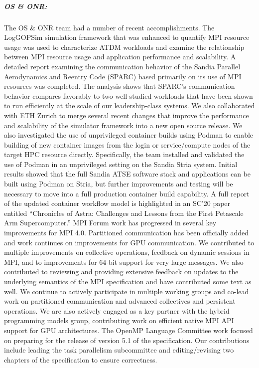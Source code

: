 \subparagraph{OS \& ONR:} The OS \& ONR team had a number of recent accomplishments. The LogGOPSim simulation framework that was enhanced to quantify MPI resource usage was used to characterize ATDM workloads and examine the relationship between MPI resource usage and application performance and scalability. A detailed report examining the communication behavior of the Sandia Parallel Aerodynamics and Reentry Code (SPARC) based primarily on its use of MPI resources was completed. The analysis shows that SPARC's communication behavior compares favorably to two well-studied workloads that have been shown to run efficiently at the scale of our leadership-class systems. We also collaborated with ETH Zurich to merge several recent changes that improve the performance and scalability of the simulator framework into a new open source release. We also investigated the use of unprivileged container builds using Podman to enable building of new container images from the login or service/compute nodes of the target HPC resource directly. Specifically, the team installed and validated the use of Podman in an unprivileged setting on the Sandia Stria system. Initial results showed that the full Sandia ATSE software stack and applications can be built using Podman on Stria, but further improvements and testing will be necessary to move into a full production container build capability.  A full report of the updated container workflow model is highlighted in an SC'20 paper entitled ``Chronicles of Astra: Challenges and Lessons from the First Petascale Arm Supercomputer.'' MPI Forum work has progressed in several key improvements for MPI 4.0. Partitioned communication has been officially added and work continues on improvements for GPU communication. We contributed to multiple improvements on collective operations, feedback on dynamic sessions in MPI, and to improvements for 64-bit support for very large messages. We also contributed to reviewing and providing extensive feedback on updates to the underlying semantics of the MPI specification and have contributed some text as well. We continue to actively participate in multiple working groups and co-lead work on partitioned communication and advanced collectives and persistent operations. We are also actively engaged as a key partner with the hybrid programming models group, contributing work on efficient native MPI API support for GPU architectures. The OpenMP Language Committee work focused on preparing for the release of version 5.1 of the specification.  Our contributions include leading the task parallelism subcommittee and editing/revising two chapters of the specification to ensure correctness.



